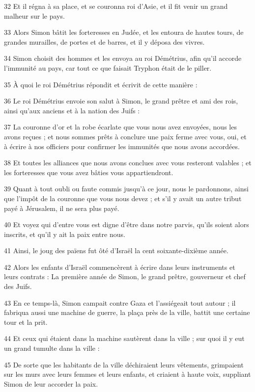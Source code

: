 \par 32 Et il régna à sa place, et se couronna roi d'Asie, et il fit venir un grand malheur sur le pays.
\par 33 Alors Simon bâtit les forteresses en Judée, et les entoura de hautes tours, de grandes murailles, de portes et de barres, et il y déposa des vivres.
\par 34 Simon choisit des hommes et les envoya au roi Démétrius, afin qu'il accorde l'immunité au pays, car tout ce que faisait Tryphon était de le piller.
\par 35 À quoi le roi Démétrius répondit et écrivit de cette manière :
\par 36 Le roi Démétrius envoie son salut à Simon, le grand prêtre et ami des rois, ainsi qu'aux anciens et à la nation des Juifs :
\par 37 La couronne d'or et la robe écarlate que vous nous avez envoyées, nous les avons reçues ; et nous sommes prêts à conclure une paix ferme avec vous, oui, et à écrire à nos officiers pour confirmer les immunités que nous avons accordées.
\par 38 Et toutes les alliances que nous avons conclues avec vous resteront valables ; et les forteresses que vous avez bâties vous appartiendront.
\par 39 Quant à tout oubli ou faute commis jusqu'à ce jour, nous le pardonnons, ainsi que l'impôt de la couronne que vous nous devez ; et s'il y avait un autre tribut payé à Jérusalem, il ne sera plus payé.
\par 40 Et voyez qui d'entre vous est digne d'être dans notre parvis, qu'ils soient alors inscrits, et qu'il y ait la paix entre nous.
\par 41 Ainsi, le joug des païens fut ôté d'Israël la cent soixante-dixième année.
\par 42 Alors les enfants d'Israël commencèrent à écrire dans leurs instruments et leurs contrats : La première année de Simon, le grand prêtre, gouverneur et chef des Juifs.
\par 43 En ce temps-là, Simon campait contre Gaza et l'assiégeait tout autour ; il fabriqua aussi une machine de guerre, la plaça près de la ville, battit une certaine tour et la prit.
\par 44 Et ceux qui étaient dans la machine sautèrent dans la ville ; sur quoi il y eut un grand tumulte dans la ville :
\par 45 De sorte que les habitants de la ville déchiraient leurs vêtements, grimpaient sur les murs avec leurs femmes et leurs enfants, et criaient à haute voix, suppliant Simon de leur accorder la paix.
